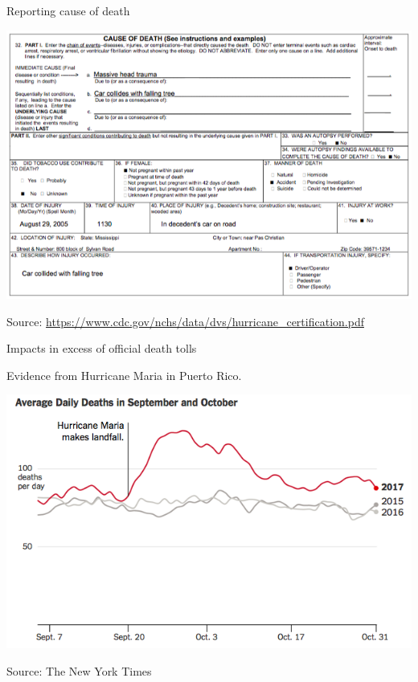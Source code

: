 \documentclass[ignorenonframetext,]{beamer}
\begin{document}
\begin{frame}{Reporting cause of death}

\begin{center}\includegraphics[width=\textwidth]{figures/cdc_notlinked_death} \end{center}

\footnotesize Source:
\url{https://www.cdc.gov/nchs/data/dvs/hurricane_certification.pdf}

\end{frame}

\begin{frame}{Impacts in excess of official death tolls}

Evidence from Hurricane Maria in Puerto Rico.

\includegraphics[width=\textwidth]{figures/maria_timeseries}

\footnotesize Source: The New York Times

\end{frame}
\end{document}
